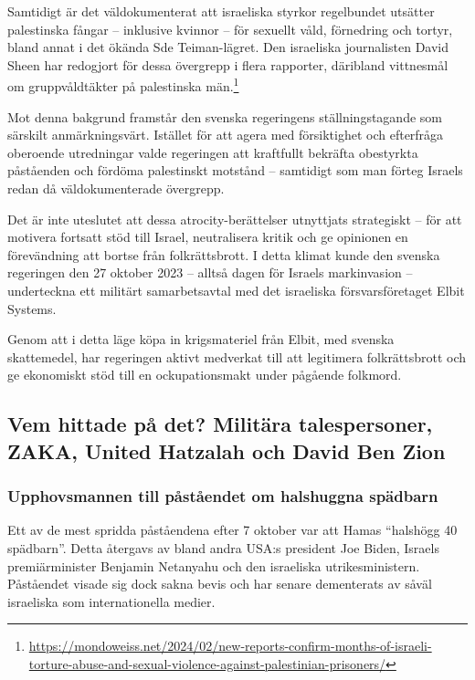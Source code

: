 Samtidigt är det väldokumenterat att israeliska styrkor regelbundet utsätter palestinska fångar – inklusive kvinnor – för sexuellt våld, förnedring och tortyr, bland annat i det ökända Sde Teiman-lägret. Den israeliska journalisten David Sheen har redogjort för dessa övergrepp i flera rapporter, däribland vittnesmål om gruppvåldtäkter på palestinska män.\footnote{\url{https://mondoweiss.net/2024/02/new-reports-confirm-months-of-israeli-torture-abuse-and-sexual-violence-against-palestinian-prisoners/}}

Mot denna bakgrund framstår den svenska regeringens ställningstagande som särskilt anmärkningsvärt. Istället för att agera med försiktighet och efterfråga oberoende utredningar valde regeringen att kraftfullt bekräfta obestyrkta påståenden och fördöma palestinskt motstånd – samtidigt som man förteg Israels redan då väldokumenterade övergrepp.

Det är inte uteslutet att dessa atrocity-berättelser utnyttjats strategiskt – för att motivera fortsatt stöd till Israel, neutralisera kritik och ge opinionen en förevändning att bortse från folkrättsbrott. I detta klimat kunde den svenska regeringen den 27 oktober 2023 – alltså dagen för Israels markinvasion – underteckna ett militärt samarbetsavtal med det israeliska försvarsföretaget Elbit Systems.

Genom att i detta läge köpa in krigsmateriel från Elbit, med svenska skattemedel, har regeringen aktivt medverkat till att legitimera folkrättsbrott och ge ekonomiskt stöd till en ockupationsmakt under pågående folkmord.

\subsection*{Vem hittade på det? Militära talespersoner, ZAKA, United Hatzalah och David Ben Zion}
\subsubsection*{Upphovsmannen till påståendet om halshuggna spädbarn}

Ett av de mest spridda påståendena efter 7 oktober var att Hamas “halshögg 40 spädbarn”. Detta återgavs av bland andra USA:s president Joe Biden, Israels premiärminister Benjamin Netanyahu och den israeliska utrikesministern. Påståendet visade sig dock sakna bevis och har senare dementerats av såväl israeliska som internationella medier.

